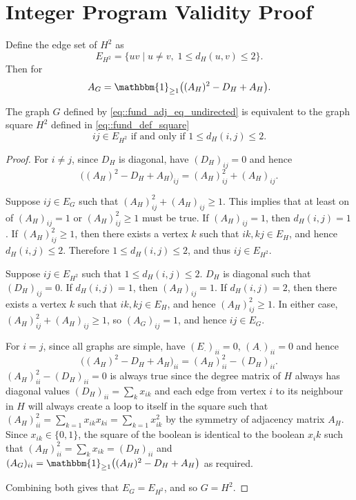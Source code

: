 
\section{Integer Program Validity Proof} \label{sec::integer_program_validity_proof}
Define the edge set of $H^2$ as 
\begin{equation} \label{eq::fund_def_square}
E_{H^2} = \{ uv \mid u \neq v,\; 1 \leq d_H(u,v) \leq 2 \}.
\end{equation}
Then for 
\begin{equation} \label{eq::fund_adj_eq_undirected}
A_G = \mathbbm{1}_{\geq 1}\big((A_H)^2 - D_H + A_H\big).
\end{equation}
\begin{lemma} \label{lemma::G_equal_to_H^2}
  The graph $G$ defined by \eqref{eq::fund_adj_eq_undirected} is equivalent to the graph square $H^2$ defined in \eqref{eq::fund_def_square} 
  \begin{equation} \label{eq::fund_def_square_expanded}
    ij \in E_{H^2} \text{ if and only if } 1 \leq d_H(i,j) \leq 2. 
  \end{equation}
\end{lemma}
\begin{proof} 
  \noindent
  For $i \neq j$, since $D_H$ is diagonal, have $(D_H)_{ij} = 0$ and hence
  \[
  \big((A_H)^2 - D_H + A_H\big)_{ij} = (A_H)^2_{ij} + (A_H)_{ij}.
  \]

  Suppose $ij \in E_G$ such that $(A_H)^2_{ij} + (A_H)_{ij} \geq 1$. This implies that at least on of $(A_H)_{ij} = 1$ or $(A_H)^2_{ij} \geq 1$ must be true. If $(A_H)_{ij} = 1$, then $d_H(i,j) = 1$.  If $(A_H)^2_{ij} \geq 1$, then there exists a vertex $k$ such that $ik, kj \in E_H$, and hence $d_H(i,j) \leq 2$. Therefore $1 \leq d_H(i,j) \leq 2$, and thus $ij \in E_{H^2}$.

  Suppose $ij \in E_{H^2}$ such that $1 \leq d_H(i,j) \leq 2$. $D_H$ is diagonal such that $(D_H)_{ij} = 0$. If $d_H(i,j) = 1$, then $(A_H)_{ij} = 1$. If $d_H(i,j) = 2$, then there exists a vertex $k$ such that $ik, kj \in E_H$, and hence $(A_H)^2_{ij} \geq 1$. In either case, $(A_H)^2_{ij} + (A_H)_{ij} \geq 1$, so $(A_G)_{ij} = 1$, and hence $ij \in E_G$.

  For $i = j$, since all graphs are simple, have $(E_{\cdot})_{ii} = 0$, $(A_{\cdot})_{ii} = 0$ and hence
  \[
  \big((A_H)^2 - D_H + A_H\big)_{ii} = (A_H)^2_{ii} - (D_H)_{ii}.
  \]
  $(A_H)^2_{ii} - (D_H)_{ii} = 0$ is always true since the degree matrix of $H$ always has diagonal values $\displaystyle (D_H)_{ii} = \sum_k x_{ik}$ and each edge from vertex $i$ to its neighbour in $H$ will always create a loop to itself in the square such that $\displaystyle (A_H)^2_{ii} = 
  \sum_{k = 1} x_{ik}x_{ki} = \sum_{k = 1} x_{ik}^2$ by the symmetry of adjacency matrix $A_H$. Since $x_{ik} \in \{0, 1\}$, the square of the boolean is identical to the boolean $x_ik$ such that $\displaystyle (A_H)^2_{ii} = \sum_k x_{ik} = (D_H)_{ii}$ and $(A_G)_{ii} = \mathbbm{1}_{\geq 1}\big((A_H)^2 - D_H + A_H\big)$ as required. 

  Combining both gives that $E_G = E_{H^2}$, and so $G = H^2$.  
\end{proof}


